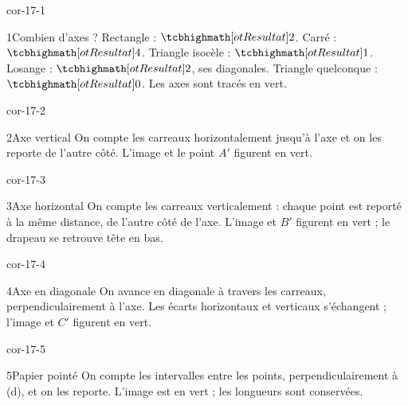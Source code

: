 \clearpage\pagestyle{otMain}\setlength{\otBlocEspacement}{2.5mm}\fontsize{11}{15}\selectfont{}
\begin{blocLivre}{cor-17-1}\begin{corrige}{1}{Combien d’axes ?}
Rectangle : $\res2$. Carré : $\res4$. Triangle isocèle : $\res1$. Losange : $\res2$, ses diagonales. Triangle quelconque : $\res0$. Les axes sont tracés en vert.
\label{fig-cor-17-1}
\end{corrige}\end{blocLivre}
\begin{blocLivre}{cor-17-2}\begin{corrige}{2}{Axe vertical}
On compte les carreaux horizontalement jusqu’à l’axe et on les reporte de l’autre côté. L’image et le point $A'$ figurent en vert.
\label{fig-cor-17-2}
\end{corrige}\end{blocLivre}
\begin{blocLivre}{cor-17-3}\begin{corrige}{3}{Axe horizontal}
On compte les carreaux verticalement : chaque point est reporté à la même distance, de l’autre côté de l’axe. L’image et $B'$ figurent en vert ; le drapeau se retrouve tête en bas.
\label{fig-cor-17-3}
\end{corrige}\end{blocLivre}
\begin{blocLivre}{cor-17-4}\begin{corrige}{4}{Axe en diagonale}
On avance en diagonale à travers les carreaux, perpendiculairement à l’axe. Les écarts horizontaux et verticaux s’échangent ; l’image et $C'$ figurent en vert.
\label{fig-cor-17-4}
\end{corrige}\end{blocLivre}
\begin{blocLivre}{cor-17-5}\begin{corrige}{5}{Papier pointé}
On compte les intervalles entre les points, perpendiculairement à (d), et on les reporte. L’image est en vert ; les longueurs sont conservées.
\label{fig-cor-17-5}
\end{corrige}\end{blocLivre}
